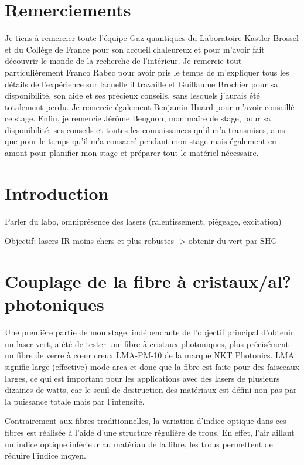 \documentclass[11pt,a4paper]{article}
\begin{document}
\newpage

\thispagestyle{empty}
\section*{Remerciements}

Je tiens à remercier toute l'équipe Gaz quantiques du Laboratoire Kastler Brossel et du Collège de France pour son accueil chaleureux et pour m'avoir fait découvrir le monde de la recherche de l'intérieur. Je remercie tout particulièrement Franco Rabec pour avoir pris le temps de m'expliquer tous les détails de l'expérience sur laquelle il travaille et Guillaume Brochier pour sa disponibilité, son aide et ses précieux conseils, sans lesquels j'aurais été totalement perdu. Je remercie également Benjamin Huard pour m'avoir conseillé ce stage. Enfin, je remercie Jérôme Beugnon, mon maîre de stage, pour sa disponibilité, ses conseils et toutes les connaissances qu'il m'a transmises, ainsi que pour le temps qu'il m'a consacré pendant mon stage mais également en amont pour planifier mon stage et préparer tout le matériel nécessaire. 
\tableofcontents
\newpage


\setcounter{page}{1}


\setlength{\parindent}{16pt}

\section{Introduction}
Parler du labo, omniprésence des lasers (ralentissement, piègeage, excitation)

Objectif: lasers IR moins chers et plus robustes -> obtenir du vert par SHG

\section{Couplage de la fibre à cristaux/al? photoniques}
Une première partie de mon stage, indépendante de l'objectif principal d'obtenir un laser vert, a été de tester une fibre à cristaux photoniques, plus précisément un fibre de verre à c\oe ur creux LMA-PM-10 de la marque NKT Photonics. LMA signifie large (effective) mode area et donc que la fibre est faite pour des faisceaux larges, ce qui est important pour les applications avec des lasers de plusieurs dizaines de watts, car le seuil de destruction des matériaux est défini non pas par la puissance totale mais par l'intensité.

Contrairement aux fibres traditionnelles, la variation d'indice optique dans ces fibres est réalisée à l'aide d'une structure régulière de trous. En effet, l'air aillant un indice optique inférieur au matériau de la fibre, les trous permettent de réduire l'indice moyen. %
\end{document}
